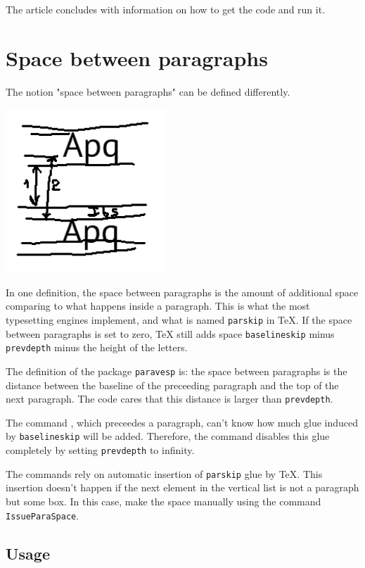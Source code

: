 \documentclass[]{ltugboat}
\begin{document}
The article concludes with information on how to get the code and run it.

\section{Space between paragraphs}

The notion "space between paragraphs" can be defined differently.

\includegraphics[width=6cm]{betwpara.png}

In one definition, the space between paragraphs is the amount of additional space comparing to what happens inside a paragraph. This is what the most typesetting engines implement, and what is named \verb|parskip| in \TeX{}. If the space between paragraphs is set to zero, \TeX{} still adds space \verb|baselineskip| minus \verb|prevdepth| minus the height of the letters.

The definition of the package \verb|paravesp| is: the space between paragraphs is the distance between the baseline of the preceeding paragraph and the top of the next paragraph. The code cares that this distance is larger than \verb|prevdepth|.

The command , which preceedes a paragraph, can't know how much glue induced by \verb|baselineskip| will be added. Therefore, the command disables this glue completely by setting \verb|prevdepth| to infinity.

The commands rely on automatic insertion of \verb|parskip| glue by \TeX. This insertion doesn't happen if the next element in the vertical list is not a paragraph but some box. In this case, make the space manually using the command \verb|IssueParaSpace|.

\subsection{Usage}
\end{document}
